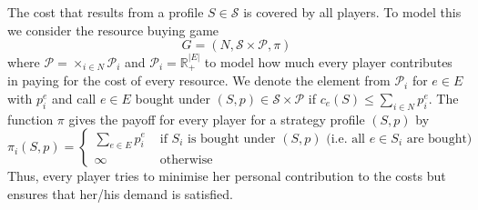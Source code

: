 \documentclass{scrartcl}
\theoremstyle{nonumberplain}
\newcommand{\tupel}[1]{\left(#1\right)}
\begin{document}
The cost that results from a profile $S\in\mathcal{S}$ is covered by all
players. To model this we consider the resource buying game 
\begin{equation*}
  G = \tupel{N, \mathcal{S}\times\mathcal{P}, \pi}
\end{equation*}
where $\mathcal{P} = \times_{i\in N}\mathcal{P}_{i}$ and
$\mathcal{P}_{i} = \mathbb{R}_{+}^{|E|}$ to model how much every player
contributes in paying for the cost of every resource. We denote the element
from $\mathcal{P}_{i}$ for $e\in E$ with $p_{i}^{e}$ and call $e\in E$ bought
under $\tupel{S, p}\in \mathcal{S}\times\mathcal{P}$ if
$c_{e}(S)\leq \sum_{i\in N}p_{i}^{e}$. The function $\pi$ gives the payoff for
every player for a strategy profile $\tupel{S, p}$ by
\begin{equation*}
  \pi_{i}(S, p) = \begin{cases}
    \sum_{e\in E}p_{i}^{e} &\text{ if $S_{i}$ is bought under
    $\tupel{S, p}$ (i.e. all $e\in S_{i}$ are bought)}\\
    \infty &\text{ otherwise}
  \end{cases}
\end{equation*}
Thus, every player tries to minimise her personal contribution to the costs
but ensures that her/his demand is satisfied.
\end{document}
